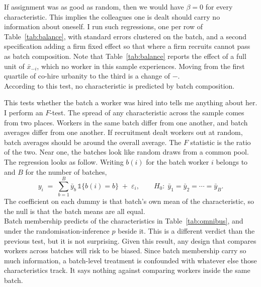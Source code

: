 \noindent If assignment was as good as random, then we would have $\beta=0$ for every characteristic. This implies the colleagues one is dealt should carry no information about oneself. I run \pnBalanceChars{} such regressions, one per row of Table~\ref{tab:balance}, with standard errors clustered on the batch, and a second specification adding a firm fixed effect so that where a firm recruits cannot pass as batch composition. Note that Table~\ref{tab:balance} reports the effect of a full unit of $\bar{x}_{-i}$, which no worker in this sample experiences. Moving from the first quartile of co-hire urbanity to the third is a change of \pnTreatPSeventyFive{}$-$\pnTreatPTwentyFive{}. \\

\noindent According to this test, no characteristic is predicted by batch composition.


\FloatBarrier


\noindent This tests whether the batch a worker was hired into tells me anything about her. I perform an $F$-test. The spread of any characteristic across the sample comes from two places. Workers in the same batch differ from one another, and batch averages differ from one another. If recruitment dealt workers out at random, batch averages should be around the overall average. The $F$ statistic is the ratio of the two. Near one, the batches look like random draws from a common pool. \\

\noindent The regression looks as follow. Writing $b(i)$ for the batch worker $i$ belongs to and $B$ for the number of batches,
\begin{equation}
\label{eq:setting-omnibus}
y_i \;=\; \sum_{b=1}^{B} \bar{y}_b \, \mathds{1}\{b(i)=b\} \;+\; \varepsilon_i ,
\qquad
H_0 : \; \bar{y}_1 = \bar{y}_2 = \cdots = \bar{y}_B .
\end{equation}
The coefficient on each dummy is that batch's own mean of the characteristic, so the null is that the batch means are all equal. \\



\noindent Batch membership predicts \pnOmniSigWord{} of the \pnOmniChars{} characteristics in Table~\ref{tab:omnibus}, and \pnOmniSigPermWord{} under the randomisation-inference $p$ beside it. This is a different verdict than the previous test, but it is not surprising. Given this result, any design that compares workers across batches will risk to be biased. Since batch membership carry so much information, a batch-level treatment is confounded with whatever else those characteristics track. It says nothing against comparing workers inside the same batch. \\
\FloatBarrier

